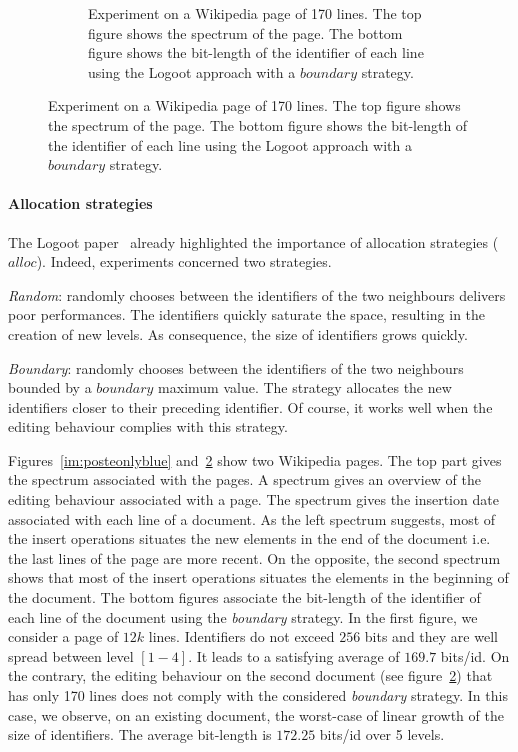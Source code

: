\begin{figure}
\begin{subfigure}[t]{0.47\textwidth}
  \caption{Experiment on a Wikipedia page of 170 lines. The top figure shows
    the spectrum of the page. The bottom figure shows the bit-length of the
    identifier of each line using the Logoot approach with a $boundary$
    strategy.}
\label{im:didyouknowonlyblue}
\end{subfigure}
\end{figure}

\paragraph{Allocation strategies}
The Logoot paper~\cite{weiss2009logoot} already highlighted the importance of
allocation strategies ($alloc$). Indeed, experiments concerned two strategies.
\begin{inparaenum}[(1)]
\item \emph{Random}: randomly chooses between the identifiers of the two
  neighbours delivers poor performances. The identifiers quickly saturate the
  space, resulting in the creation of new levels. As consequence, the size of
  identifiers grows quickly.
\item \emph{Boundary}: randomly chooses between the identifiers of the two
  neighbours bounded by a $boundary$ maximum value. The strategy allocates the
  new identifiers closer to their preceding identifier. Of course, it works
  well when the editing behaviour complies with this strategy.
\end{inparaenum}

Figures~\ref{im:posteonlyblue} and~\ref{im:didyouknowonlyblue} show two
Wikipedia pages. The top part gives the spectrum associated with the pages. A
spectrum gives an overview of the editing behaviour associated with a page. The
spectrum gives the insertion date associated with each line of a document.  As
the left spectrum suggests, most of the insert operations situates the new
elements in the end of the document i.e. the last lines of the page are more
recent. On the opposite, the second spectrum shows that most of the insert
operations situates the elements in the beginning of the document.  The bottom
figures associate the bit-length of the identifier of each line of the document
using the \emph{boundary} strategy. In the first figure, we consider a page of
$12k$ lines. Identifiers do not exceed $256$ bits and they are well spread
between level $[1-4]$. It leads to a satisfying average of $169.7$ bits/id. On
the contrary, the editing behaviour on the second document (see
figure~\ref{im:didyouknowonlyblue}) that has only 170 lines does not comply
with the considered \emph{boundary} strategy. In this case, we observe, on an
existing document, the worst-case of linear growth of the size of identifiers.
The average bit-length is $172.25$ bits/id over 5 levels.

